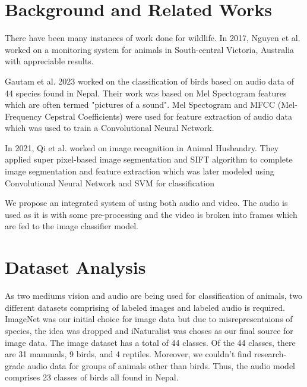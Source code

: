 \documentclass[fleqn, 10pt, twoside]{IOEGC}
\begin{document}
\section{Background and Related Works}
There have been many instances of work done for wildlife. In 2017, Nguyen et al.\cite{r4} worked on a monitoring system for animals in South-central Victoria, Australia with appreciable results.
\par
Gautam et al. 2023 \cite{r5} worked on the classification of birds based on audio data of 44 species found in Nepal. Their work was based on Mel Spectogram features which are often termed "pictures of a sound". Mel Spectogram and MFCC (Mel-Frequency Cepstral Coefficients) were used for feature extraction of audio data which was used to train a Convolutional Neural Network.
\par
In 2021, Qi et al. \cite{r6} worked on image recognition in Animal Husbandry. They applied super pixel-based image segmentation and SIFT algorithm to complete image segmentation and feature extraction which was later modeled using Convolutional Neural Network and SVM for classification
\par
We propose an integrated system of using both audio and video. The audio is used as it is with some pre-processing and the video is broken into frames which are fed to the image classifier model.

\section{Dataset Analysis}
As two mediums vision and audio are being used for classification of animals, two different datasets comprising of labeled images and labeled audio is required. ImageNet was our initial choice for image data but due to misrepresentaions of species, the idea was dropped and iNaturalist was choses as our final source for image data.\cite{r10} 
The image dataset has a total of 44 classes. Of the 44 classes, there are 31 mammals, 9 birds, and 4 reptiles. Moreover, we couldn’t find research-grade audio data for groups of animals other than birds. Thus, the audio model comprises 23 classes of birds all found in Nepal.
\end{document}
